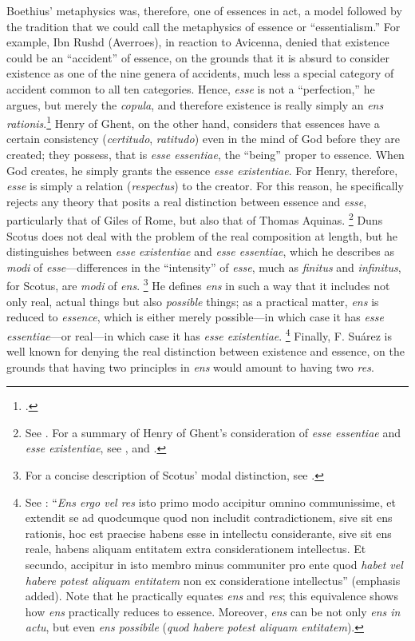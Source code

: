 Boethius' metaphysics was, therefore, one of essences in act, a model followed by the tradition that we could call the metaphysics of essence or ``essentialism.'' For example, Ibn Rushd (Averroes), in reaction to Avicenna, denied that existence could be an ``accident'' of essence, on the grounds that it is absurd to consider existence as one of the nine genera of accidents, much less a special category of accident common to all ten categories. Hence, \emph{esse} is not a ``perfection,'' he argues, but merely the \emph{copula}, and therefore existence is really simply an \emph{ens rationis}.\footcite[See][68--69]{gilson:letre} Henry of Ghent, on the other hand, considers that essences have a certain consistency (\emph{certitudo}, \emph{ratitudo}) even in the mind of God before they are created; they possess, that is \emph{esse essentiae}, the ``being'' proper to essence. When God creates, he simply grants the essence \emph{esse existentiae}. For Henry, therefore, \emph{esse} is simply a relation (\emph{respectus}) to the creator. For this reason, he specifically rejects any theory that posits a real distinction between essence and \emph{esse}, particularly that of Giles of Rome, but also that of Thomas Aquinas.%
%
\footnote{See \cite[474--475]{copleston:history:02}. For a summary of Henry of Ghent's consideration of \emph{esse essentiae} and \emph{esse existentiae}, see \cite[450--451]{gilson:history}, and \cite[6--7]{stanford:henry-of-ghent}.} Duns Scotus does not deal with the problem of the real composition at length, but he distinguishes between \emph{esse existentiae} and \emph{esse essentiae}, which he describes as \emph{modi} of \emph{esse}---differences in the ``intensity'' of \emph{esse}, much as \emph{finitus} and \emph{infinitus}, for Scotus, are \emph{modi} of \emph{ens}.%
%
\footnote{For a concise description of Scotus' modal distinction, see \cite[25--26]{companion:scotus}.} He defines \emph{ens} in such a way that it includes not only real, actual things but also \emph{possible} things; as a practical matter, \emph{ens} is reduced to \emph{essence}, which is either merely possible---in which case it has \emph{esse essentiae}---or real---in which case it has  \emph{esse existentiae}.%
%
\footnote{See \cite[q.~3, {[2]}, n.~1]{scotus:quodlibet}: ``\emph{Ens ergo vel res} isto primo modo accipitur omnino communissime, et extendit se ad quodcumque quod non includit contradictionem, sive sit ens rationis, hoc est praecise habens esse in intellectu considerante, sive sit ens reale, habens aliquam entitatem extra considerationem intellectus. Et secundo, accipitur in isto membro minus communiter pro ente quod \emph{habet vel habere potest aliquam entitatem} non ex consideratione intellectus'' (emphasis added). Note that he practically equates \emph{ens} and \emph{res}; this equivalence shows how \emph{ens} practically reduces to essence. Moreover, \emph{ens} can be not only \emph{ens in actu}, but even \emph{ens possibile} (\emph{quod habere potest aliquam entitatem}).}  Finally, F. Suárez is well known for denying the real distinction between existence and essence, on the grounds that having two principles in \emph{ens} would amount to having two \emph{res}.%
